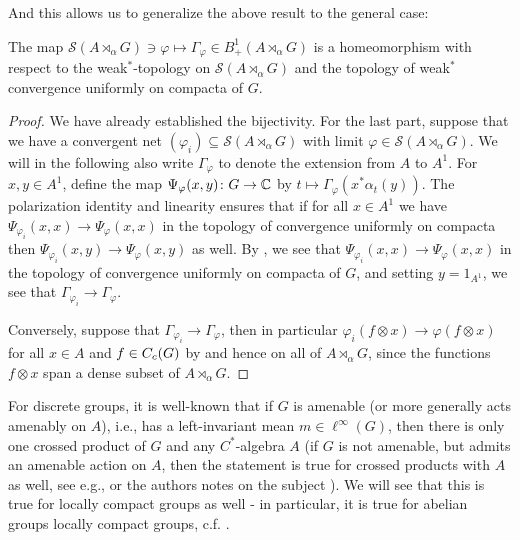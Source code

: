 And this allows us to generalize the above result to the general case:
\begin{proposition}
The map $\mathcal{S}(A \rtimes_\alpha G) \ni \varphi \mapsto \Gamma_\varphi \in B_+^1(A \rtimes_\alpha G)$ is a homeomorphism with respect to the weak$^*$-topology on $\mathcal{S}(A \rtimes_\alpha G)$ and the topology of weak$^*$ convergence uniformly on compacta of $G$.	
\end{proposition}
\begin{proof}
We have already established the bijectivity. For the last part, suppose that we have a convergent net $(\varphi_i) \subseteq \mathcal{S}(A \rtimes _\alpha  G)$	with limit $\varphi \in \mathcal{S}(A \rtimes_\alpha G)$. We will in the following also write $\Gamma_\varphi$ to denote the extension from $A$ to $A^1$. For $x,y \in A^1$, define the map $\Psi_{\varphi}(x,y) \colon G \to \mathbb{C}$ by $t \mapsto \Gamma_\varphi(x^* \alpha_t(y))$. The polarization identity and linearity ensures that if for all $x \in A^1$ we have $\Psi_{\varphi_i}(x,x) \to \Psi_{\varphi}(x,x)$ in the topology of convergence uniformly on compacta then $\Psi_{\varphi_i}(x,y) \to \Psi_{\varphi}(x,y)$ as well. By , we see that $\Psi_{\varphi_i}(x,x) \to \Psi_{\varphi}(x,x)$ in the topology of convergence uniformly on compacta of $G$, and setting $y = 1_{A^1}$, we see that $\Gamma_{\varphi_i} \to \Gamma_\varphi$.

Conversely, suppose that $\Gamma_{\varphi_i} \to \Gamma_{\varphi}$, then in particular $\varphi_{i}(f \otimes x) \to \varphi(f \otimes x)$ for all $x \in A$ and $f \in C_c(G)$ by  and hence on all of $A \rtimes_\alpha G$, since the functions $f \otimes x$ span a dense subset of $A \rtimes_\alpha G$.
\end{proof}

For discrete groups, it is well-known  that if $G$ is amenable (or more generally acts amenably on $A$), i.e., has a left-invariant mean $m \in \ell^\infty(G)$, then there is only one crossed product of $G$ and any $C^*$-algebra $A$ (if $G$ is not amenable, but admits an amenable action on $A$, then the statement is true for crossed products with $A$ as well, see e.g., \cite[4.3.4]{brown2008c} or the authors notes on the subject \cite[Part 2, pg. 26, 32]{approxtalk}). We will see that this is true for locally compact groups as well - in particular, it is true for abelian groups locally compact groups, c.f. \cite[appendix G]{bekka2008kazhdan}.

